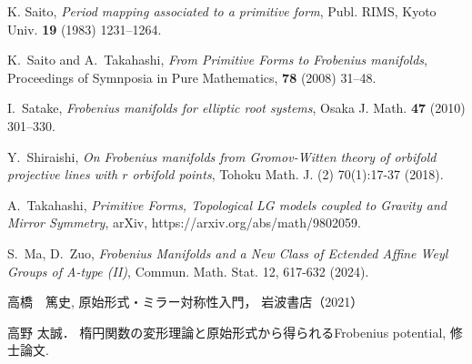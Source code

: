 \documentclass[a4paper,11pt]{jbook}
\theoremstyle{plain}
\theoremstyle{definition}
\theoremstyle{remark}
\theoremstyle{proof}
\numberwithin{equation}{section}
\begin{document}
\begin{thebibliography}{99}
{
K. Saito,
\textit{Period mapping associated to a primitive form},
Publ. RIMS, Kyoto Univ. {\bf 19} (1983) 1231--1264.

K.~Saito and A.~Takahashi,
{\it From Primitive Forms to Frobenius manifolds},
Proceedings of Symnposia in Pure Mathematics, {\bf 78} (2008) 31--48.

I.~Satake,
{\it Frobenius manifolds for elliptic root systems},
Osaka J. Math. {\bf 47} (2010) 301–330.

Y.~Shiraishi,
{\it On Frobenius manifolds from Gromov-Witten theory of orbifold projective lines with $r$ orbifold points},
Tohoku Math. J. (2) 70(1):17-37 (2018).

A.~Takahashi,
{\it Primitive Forms, Topological LG models coupled to Gravity and Mirror Symmetry},
arXiv, https://arxiv.org/abs/math/9802059.

S.~Ma, D.~Zuo,
{\it Frobenius Manifolds and a New Class of Ectended Affine Weyl Groups of A-type (II)},
Commun. Math. Stat. 12, 617-632 (2024).

高橋　篤史,
原始形式・ミラー対称性入門，
岩波書店（2021）

高野 太誠．
楕円関数の変形理論と原始形式から得られるFrobenius potential, 修士論文.

}
\end{thebibliography}
\end{document}
